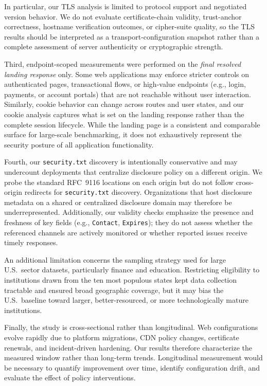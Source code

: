 \documentclass[a4paper,fleqn]{cas-sc}
\begin{document}
In particular, our TLS analysis is limited to protocol support and negotiated version behavior. We do not evaluate certificate-chain validity, trust-anchor correctness, hostname verification outcomes, or cipher-suite quality, so the TLS results should be interpreted as a transport-configuration snapshot rather than a complete assessment of server authenticity or cryptographic strength.

Third, endpoint-scoped measurements were performed on the \emph{final resolved landing response} only. 
Some web applications may enforce stricter controls on authenticated pages, transactional flows, or high-value endpoints (e.g., login, payments, or account portals) that are not reachable without user interaction. 
Similarly, cookie behavior can change across routes and user states, and our cookie analysis captures what is set on the landing response rather than the complete session lifecycle. 
While the landing page is a consistent and comparable surface for large-scale benchmarking, it does not exhaustively represent the security posture of all application functionality.

Fourth, our \texttt{security.txt} discovery is intentionally conservative and may undercount deployments that centralize disclosure policy on a different origin. 
We probe the standard RFC~9116 locations on each origin but do not follow cross-origin redirects for \texttt{security.txt} discovery. 
Organizations that host disclosure metadata on a shared or centralized disclosure domain may therefore be underrepresented. 
Additionally, our validity checks emphasize the presence and freshness of key fields (e.g., \texttt{Contact}, \texttt{Expires}); they do not assess whether the referenced channels are actively monitored or whether reported issues receive timely responses.

An additional limitation concerns the sampling strategy used for large U.S.\ sector datasets, particularly finance and education. Restricting eligibility to institutions drawn from the ten most populous states kept data collection tractable and ensured broad geographic coverage, but it may bias the U.S.\ baseline toward larger, better-resourced, or more technologically mature institutions. 

Finally, the study is cross-sectional rather than longitudinal. 
Web configurations evolve rapidly due to platform migrations, CDN policy changes, certificate renewals, and incident-driven hardening. 
Our results therefore characterize the measured window rather than long-term trends. 
Longitudinal measurement would be necessary to quantify improvement over time, identify configuration drift, and evaluate the effect of policy interventions.
\end{document}
